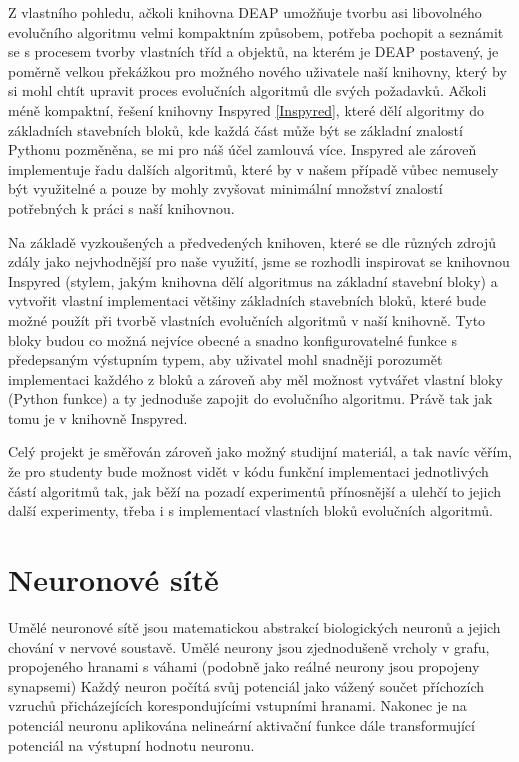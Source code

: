 Z vlastního pohledu, ačkoli knihovna DEAP umožňuje tvorbu asi
libovolného evolučního algoritmu velmi kompaktním způsobem, potřeba pochopit a
seznámit se s procesem tvorby vlastních tříd a objektů, na kterém je DEAP
postavený, je poměrně velkou překážkou pro možného nového uživatele naší
knihovny, který by si mohl chtít upravit proces evolučních algoritmů dle
svých požadavků. Ačkoli méně kompaktní, řešení knihovny Inspyred
\ref{Inspyred}, které dělí algoritmy do základních stavebních bloků, kde každá
část může být se základní znalostí Pythonu pozměněna, se mi pro náš účel
zamlouvá více. Inspyred ale zároveň implementuje řadu dalších algoritmů, které
by v našem případě vůbec nemusely být využitelné a pouze by mohly zvyšovat
minimální množství znalostí potřebných k práci s naší knihovnou.

Na základě vyzkoušených a předvedených knihoven, které se dle různých zdrojů
\citep{fortin2012deap} zdály jako nejvhodnější pro naše využití, jsme se
rozhodli inspirovat se knihovnou Inspyred (stylem, jakým knihovna dělí
algoritmus na základní stavební bloky) a vytvořit vlastní implementaci většiny
základních stavebních bloků, které bude možné použít při tvorbě vlastních
evolučních algoritmů v naší knihovně. Tyto bloky budou co možná nejvíce obecné
a snadno konfigurovatelné funkce s předepsaným výstupním typem, aby uživatel
mohl snadněji porozumět implementaci každého z bloků a zároveň aby měl možnost
vytvářet vlastní bloky (Python funkce) a ty jednoduše zapojit do evolučního
algoritmu. Právě tak jak tomu je v knihovně Inspyred. 

Celý projekt je směřován zároveň jako možný studijní materiál, a tak navíc
věřím, že pro studenty bude možnost vidět v kódu funkční implementaci
jednotlivých částí algoritmů tak, jak běží na pozadí experimentů přínosnější a
ulehčí to jejich další experimenty, třeba i s implementací vlastních bloků
evolučních algoritmů.

\section{Neuronové sítě} \label{NN}
Umělé neuronové sítě jsou matematickou abstrakcí biologických neuronů a jejich
chování v nervové soustavě. Umělé neurony jsou zjednodušeně vrcholy v grafu,
propojeného hranami s váhami (podobně jako reálné neurony jsou propojeny
synapsemi) Každý neuron počítá svůj potenciál jako vážený součet příchozích
vzruchů přicházejících korespondujícími vstupními hranami. Nakonec je
na potenciál neuronu aplikována nelineární aktivační funkce dále transformující
potenciál na výstupní hodnotu neuronu.

